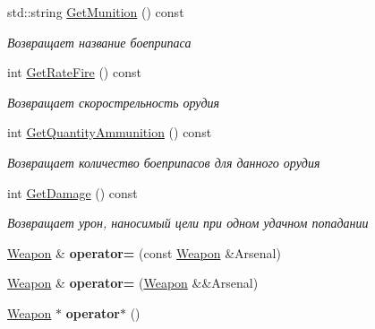 \begin{DoxyCompactItemize}
std\+::string \mbox{\hyperlink{class_aircraft_carrier_group_1_1_weapon_af7bc46055c221b56bedd89f0ae72b0f9}{Get\+Munition}} () const
\begin{DoxyCompactList}\small\item\em Возвращает название боеприпаса \end{DoxyCompactList}\item 
\mbox{\label{class_aircraft_carrier_group_1_1_weapon_a48f47f37247032c6f8b6847f0efb6bf9}} 
int \mbox{\hyperlink{class_aircraft_carrier_group_1_1_weapon_a48f47f37247032c6f8b6847f0efb6bf9}{Get\+Rate\+Fire}} () const
\begin{DoxyCompactList}\small\item\em Возвращает скорострельность орудия \end{DoxyCompactList}\item 
\mbox{\label{class_aircraft_carrier_group_1_1_weapon_aa86f34c5330200d6cba0aa46a8c55760}} 
int \mbox{\hyperlink{class_aircraft_carrier_group_1_1_weapon_aa86f34c5330200d6cba0aa46a8c55760}{Get\+Quantity\+Ammunition}} () const
\begin{DoxyCompactList}\small\item\em Возвращает количество боеприпасов для данного орудия \end{DoxyCompactList}\item 
\mbox{\label{class_aircraft_carrier_group_1_1_weapon_adee6de4abae36cc738acc3cb276f20b4}} 
int \mbox{\hyperlink{class_aircraft_carrier_group_1_1_weapon_adee6de4abae36cc738acc3cb276f20b4}{Get\+Damage}} () const
\begin{DoxyCompactList}\small\item\em Возвращает урон, наносимый цели при одном удачном попадании \end{DoxyCompactList}\item 
\mbox{\label{class_aircraft_carrier_group_1_1_weapon_a1b9ac69fb978eaea5fc5e044e1e20e6c}} 
\mbox{\hyperlink{class_aircraft_carrier_group_1_1_weapon}{Weapon}} \& {\bfseries operator=} (const \mbox{\hyperlink{class_aircraft_carrier_group_1_1_weapon}{Weapon}} \&Arsenal)
\item 
\mbox{\label{class_aircraft_carrier_group_1_1_weapon_aea2e99771201dcdabb5958cc0cd33bb4}} 
\mbox{\hyperlink{class_aircraft_carrier_group_1_1_weapon}{Weapon}} \& {\bfseries operator=} (\mbox{\hyperlink{class_aircraft_carrier_group_1_1_weapon}{Weapon}} \&\&Arsenal)
\item 
\mbox{\label{class_aircraft_carrier_group_1_1_weapon_a094ccf9f53adc5a43f261f32de24d271}} 
\mbox{\hyperlink{class_aircraft_carrier_group_1_1_weapon}{Weapon}} $\ast$ {\bfseries operator$\ast$} ()
\end{DoxyCompactItemize}
